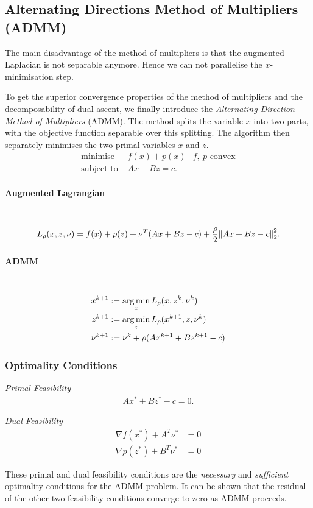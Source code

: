 \subsection{Alternating Directions Method of Multipliers (ADMM)}
The main disadvantage of the method of multipliers is that the augmented Laplacian is not separable anymore. Hence we can not parallelise the $x$-minimisation step.

To get the superior convergence properties of the method of multipliers and the decomposability of dual ascent, we finally introduce the \emph{Alternating Direction Method of Multipliers} (ADMM). The method splits the variable $x$ into two parts, with the objective function separable over this splitting. The algorithm then separately minimises the two primal variables $x$ and $z$.
\begin{align*}
    \text{minimise }&f(x)+p(x) & f,\ p\text{ convex}\\
    \text{subject to }&Ax+Bz = c.
\end{align*}
\paragraph{Augmented Lagrangian} \
\begin{align*}
    L_\rho(x,z,\nu) = f(x) + p(z) +\nu^T (Ax+Bz-c) + {\rho\over 2}\norm{Ax+Bz-c}_2^2.
\end{align*}
\paragraph{ADMM}\
\begin{align*}
    x^{k+1} &:= \operatorname*{arg\,min}_x L_\rho (x, z^k, \nu^k)\\
    z^{k+1} &:= \operatorname*{arg\,min}_z L_\rho (x^{k+1}, z, \nu^k)\\
    \nu^{k+1} &:= \nu^k +\rho(Ax^{k+1}+Bz^{k+1}-c)
\end{align*}

\subsubsection{Optimality Conditions}
\begin{description}
\item \emph{Primal Feasibility}
    \begin{align*}
        Ax^* + Bz^* -c = 0.
    \end{align*}
\item \emph{Dual Feasibility}
    \begin{align*}
        \nabla f(x^*) +A^T \nu^* &= 0\\
        \nabla p(z^*) +B^T \nu^* &= 0
    \end{align*}
\end{description}
These primal and dual feasibility conditions are the \emph{necessary} and \emph{sufficient} optimality conditions for the ADMM problem.
It can be shown that the residual of the other two feasibility conditions converge to zero as ADMM proceeds.\\


